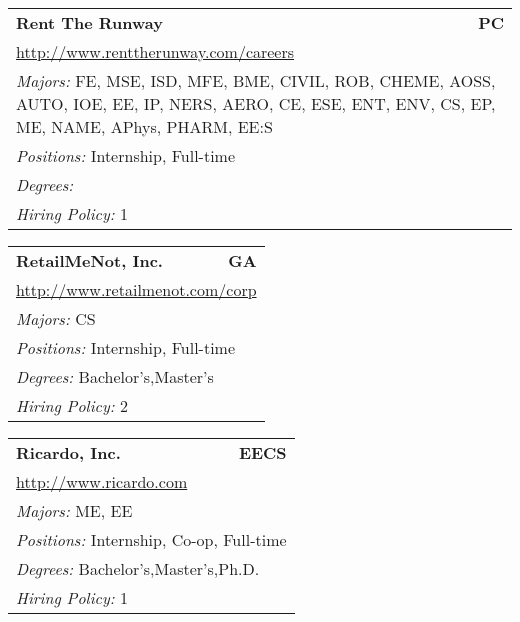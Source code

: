 \documentclass[twoside]{article}
\begin{document}
\begin{center}
\begin{multicols}{3}
\begin{FlushLeft}
\begin{minipage}{.9\columnwidth}
\end{minipage}
 
\begin{minipage}{.9\columnwidth}\begin{tabularx}{.95\columnwidth}{Xr}
                 {\Large\bf Rent The Runway} & {\Large\bf PC}\\
    \multicolumn{2}{p{.95\columnwidth}}{\url{http://www.renttherunway.com/careers}}\\
    \multicolumn{2}{p{.95\columnwidth}}{\emph{Majors:} FE, MSE, ISD, MFE, BME, CIVIL, ROB, CHEME, AOSS, AUTO, IOE, EE, IP, NERS, AERO, CE, ESE, ENT, ENV, CS, EP, ME, NAME, APhys, PHARM, EE:S}\\
    \multicolumn{2}{p{.95\columnwidth}}{\emph{Positions:} Internship, Full-time}\\
    \multicolumn{2}{p{.95\columnwidth}}{\emph{Degrees:} }\\
    \multicolumn{2}{p{.95\columnwidth}}{\emph{Hiring Policy:} 1}\\
    \end{tabularx}
    
\end{minipage}
 
\begin{minipage}{.9\columnwidth}\begin{tabularx}{.95\columnwidth}{Xr}
                 {\Large\bf RetailMeNot, Inc.} & {\Large\bf GA}\\
    \multicolumn{2}{p{.95\columnwidth}}{\url{http://www.retailmenot.com/corp}}\\
    \multicolumn{2}{p{.95\columnwidth}}{\emph{Majors:} CS}\\
    \multicolumn{2}{p{.95\columnwidth}}{\emph{Positions:} Internship, Full-time}\\
    \multicolumn{2}{p{.95\columnwidth}}{\emph{Degrees:} Bachelor's,Master's}\\
    \multicolumn{2}{p{.95\columnwidth}}{\emph{Hiring Policy:} 2}\\
    \end{tabularx}
    
\end{minipage}
 
\begin{minipage}{.9\columnwidth}\begin{tabularx}{.95\columnwidth}{Xr}
                 {\Large\bf Ricardo, Inc.} & {\Large\bf EECS}\\
    \multicolumn{2}{p{.95\columnwidth}}{\url{http://www.ricardo.com}}\\
    \multicolumn{2}{p{.95\columnwidth}}{\emph{Majors:} ME, EE}\\
    \multicolumn{2}{p{.95\columnwidth}}{\emph{Positions:} Internship, Co-op, Full-time}\\
    \multicolumn{2}{p{.95\columnwidth}}{\emph{Degrees:} Bachelor's,Master's,Ph.D.}\\
    \multicolumn{2}{p{.95\columnwidth}}{\emph{Hiring Policy:} 1}\\
    \end{tabularx}
    

\end{minipage}
\end{FlushLeft}
\end{multicols}
\end{center}
\end{document}
